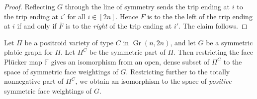 \documentclass[ALCO,ThmDefs,Unicode,epreuves]{cedram}
\DeclareMathOperator{\Gr}{Gr}
\begin{document}
\begin{proof}
Reflecting $G$ through the line of symmetry sends the trip ending at $i$ to the trip ending at $i'$ for all $i \in [2n]$. Hence $F$ is to the the left of the trip ending at $i$ if and only if $\overline{F}$ is to the \emph{right} of the trip ending at $i'$. The claim follows. \end{proof}



\begin{prop}
\label{sym_face_weights}
Let $\Pi$ be a positroid variety of type $C$ in $\Gr(n,2n)$, and let $G$ be a symmetric plabic graph for $\Pi$. Let $\Pi^C$ be the symmetric part of $\Pi$. Then restricting the face Pl{\"u}cker map $\mathbb{F}$ gives an isomorphism from an open, dense subset of $\Pi^C$ to the space of symmetric face weightings of $G$. Restricting further to the totally nonnegative part of $\Pi^C$, we obtain an isomorphism to the space of \emph{positive} symmetric face weightings of $G$.
\end{prop}
\end{document}
